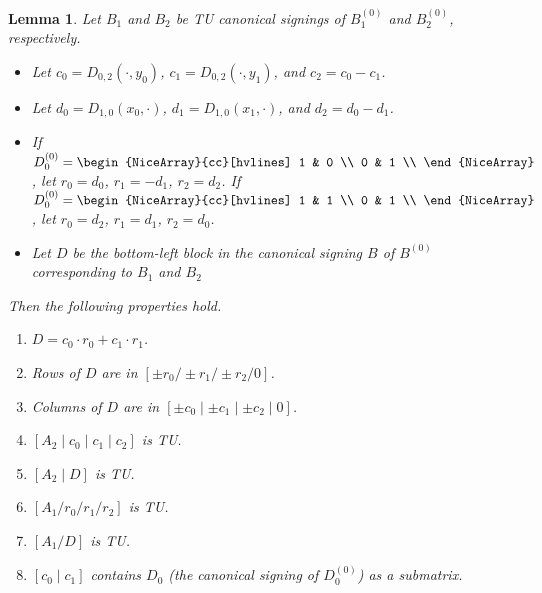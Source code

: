 \documentclass{article}
\newtheorem{lemma}{Lemma}
\theoremstyle{definition}
\begin{document}
\begin{lemma}\label{lem:canonical_signing_properties}
    Let $B_{1}$ and $B_{2}$ be TU canonical signings of $B_{1}^{(0)}$ and $B_{2}^{(0)}$, respectively.
    \begin{itemize}
        \item Let $c_{0} = D_{0, 2} (\cdot, y_{0})$, $c_{1} = D_{0, 2} (\cdot, y_{1})$, and $c_{2} = c_{0} - c_{1}$.
        \item Let $d_{0} = D_{1, 0} (x_{0}, \cdot)$, $d_{1} = D_{1, 0} (x_{1}, \cdot)$, and $d_{2} = d_{0} - d_{1}$.
        \item If $D_{0}^{(0)} = \begin{NiceArray}{cc}[hvlines] 1 & 0 \\ 0 & 1 \\ \end{NiceArray}$, let $r_{0} = d_{0}$, $r_{1} = -d_{1}$, $r_{2} = d_{2}$. If $D_{0}^{(0)} = \begin{NiceArray}{cc}[hvlines] 1 & 1 \\ 0 & 1 \\ \end{NiceArray}$, let $r_{0} = d_{2}$, $r_{1} = d_{1}$, $r_{2} = d_{0}$.
        \item Let $D$ be the bottom-left block in the canonical signing $B$ of $B^{(0)}$ corresponding to $B_{1}$ and $B_{2}$
    \end{itemize}
    Then the following properties hold.
    \begin{enumerate}
        \item\label{item:canonical_signing_D_eq} $D = c_{0} \cdot r_{0} + c_{1} \cdot r_{1}$.
        \item\label{item:canonical_signing_D_rows} Rows of $D$ are in $[\pm r_{0} / \pm r_{1} / \pm r_{2} / 0]$.
        \item\label{item:canonical_signing_D_cols} Columns of $D$ are in $[\pm c_{0} \mid \pm c_{1} \mid \pm c_{2} \mid 0]$.
        \item\label{item:canonical_signing_TU_A_2_cs} $[A_{2} \mid c_{0} \mid c_{1} \mid c_{2}]$ is TU.
        \item\label{item:canonical_signing_TU_A_2_D} $[A_{2} \mid D]$ is TU.
        \item\label{item:canonical_signing_TU_A_1_rs} $[A_{1} / r_{0} / r_{1} / r_{2}]$ is TU.
        \item\label{item:canonical_signing_TU_A_1_D} $[A_{1} / D]$ is TU.
        \item $[c_{0} \mid c_{1}]$ contains $D_{0}$ (the canonical signing of $D_{0}^{(0)}$) as a submatrix.
    \end{enumerate}
\end{lemma}
\end{document}
